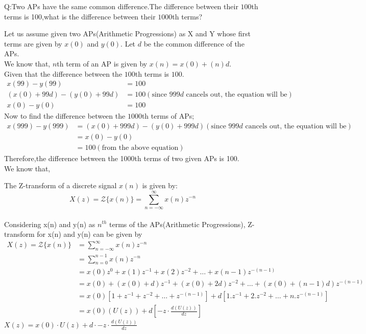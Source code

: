 \documentclass[journal,12pt,onecolumn]{IEEEtran}
\theoremstyle{remark}
\begin{document}
\let\vec\mathbf







\bigskip

\renewcommand{\thefigure}{\theenumi}
\renewcommand{\thetable}{\theenumi}

Q:Two APs have the same common difference.The difference between their $100${th} terms is 100,what is the difference between their $1000${th} terms?

\solution

Let us assume given two APs(Arithmetic Progressions) as X and Y whose first terms are given by $x(0)$ and $y(0)$. Let $d$ be the common difference of the APs. 
\\
We know that, $n$th term of an AP is given by $x(n) = x(0)+(n)d$.
\\
Given that the difference between the $100$th terms is $100$.
\begin{align}
x(99) - y(99) &= 100 \\
(x(0) + 99d) - (y(0) + 99d) &= 100
(\text{since $999d$ cancels out, the equation will be}) \\
x(0) - y(0) &= 100
\end{align}
Now to find the difference between the $1000$th terms of APs;
\begin{align}
x(999) - y(999) &= (x(0) + 999d) - (y(0) + 999d)
(\text{since $999d$ cancels out, the equation will be})\\
&= x(0) - y(0)\\
&= 100  
(\text{from the above equation})
\end{align}
Therefore,the difference between the 1000th terms of two given APs is 100.\\

We know that,

The Z-transform of a discrete signal $x(n)$ is given by:
\[ X(z) = \mathcal{Z}\{x(n)\} = \sum_{n=-\infty}^{\infty} x(n)z^{-n} \]
\\ Considering x(n) and y(n) as $n^{th}$ terms of the APs(Arithmetic Progressions), Z-transform for x(n) and y(n) can be given by
\begin{align}
X(z) = \mathcal{Z}\{x(n)\} 
&= \sum_{n=-\infty}^{\infty} x(n)z^{-n} \\
&=\sum_{n=0}^{n-1}x(n)z^{-n} \\
&=x(0)z^{0}+x(1)z^{-1}+x(2)z^{-2}+ \ldots +x(n-1)z^{-(n-1)} \\
&=x(0)+(x(0)+d)z^{-1}+(x(0)+2d)z^{-2}+ \ldots +(x(0)+(n-1)d)z^{-(n-1)} \\
&=x(0)[1+ z^{-1} + z^{-2} + \ldots + z^{-(n-1)}] + d[1.z^{-1}+2.z^{-2}+\ldots+n.z^{-(n-1)}] \\
&=x(0)(U(z)) + d[-z \cdot \frac {d(U(z))}{dz}]
\end{align}
$X(z) = x(0)\cdot U(z) + d\cdot{-z} \cdot \frac {d(U(z))}{dz}  $ \\
\end{document}
